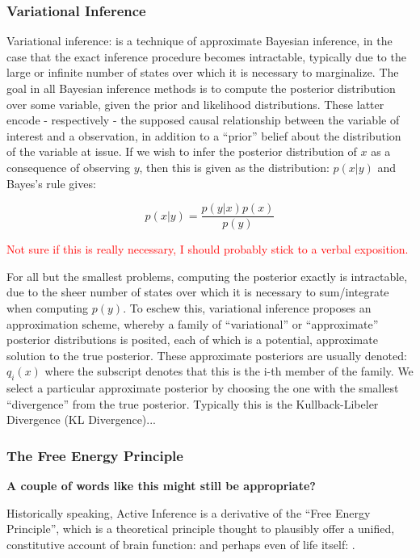 \documentclass[onecolumn]{IEEEtran}
\begin{document}
\vspace{12pt}
\subsubsection{Variational Inference}
Variational inference: \textcite{Variational-Inference-Reviews} is a technique of approximate Bayesian inference, in the case that the exact inference procedure becomes intractable, typically due to the large or infinite number of states over which it is necessary to marginalize. The goal in all Bayesian inference methods is to compute the posterior distribution over some variable, given the prior and likelihood distributions. These latter encode - respectively - the supposed causal relationship between the variable of interest and a observation, in addition to a ``prior'' belief about the distribution of the variable at issue. If we wish to infer the posterior distribution of $x$ as a consequence of observing $y$, then this is given as the distribution: $p(x | y)$ and Bayes's rule gives: 

$$ p(x | y) = \frac{p(y | x)p(x)}{p(y)} $$

\textcolor{red}{Not sure if this is really necessary, I should probably stick to a verbal exposition.}

For all but the smallest problems, computing the posterior exactly is intractable, due to the sheer number of states over which it is necessary to sum/integrate when computing $p(y)$. To eschew this, variational inference proposes an approximation scheme, whereby a family of ``variational'' or ``approximate'' posterior distributions is posited, each of which is a potential, approximate solution to the true posterior. These approximate posteriors are usually denoted: $q_i(x)$ where the subscript denotes that this is the i-th member of the family. We select a particular approximate posterior by choosing the one with the smallest ``divergence'' from the true posterior. Typically this is the Kullback-Libeler Divergence (KL Divergence)...

\vspace{12pt}
\subsubsection{The Free Energy Principle}

\textbf{A couple of words like this might still be appropriate?}

Historically speaking, Active Inference is a derivative of the ``Free Energy Principle'', which is a theoretical principle thought to plausibly offer a unified, constitutive account of brain function: \textcite{FEP-Rough-Guide-Brain} and perhaps even of life itself: \textcite{Life-As-We-Know-It}. 
\end{document}
